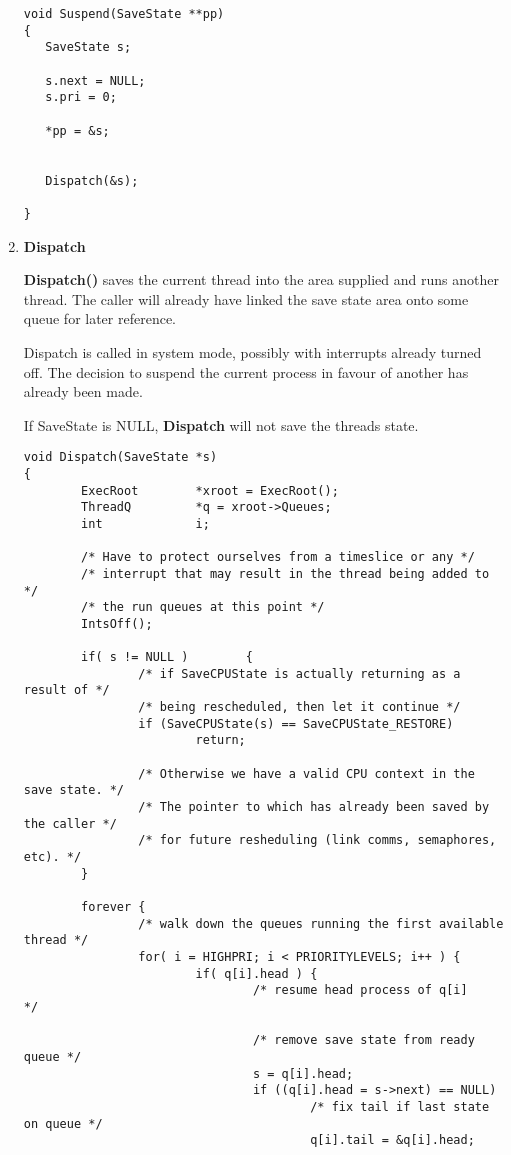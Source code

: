 \begin{enumerate}
\scriptsize
\begin{verbatim}
void Suspend(SaveState **pp)
{
   SaveState s;

   s.next = NULL;
   s.pri = 0;

   *pp = &s;


   Dispatch(&s);

}
\end{verbatim}
\normalsize

\item {\bf Dispatch}

{\bf Dispatch()} saves the current thread into the area supplied
and runs another thread.
The caller will already have linked the save state area onto
some queue for later reference.

Dispatch is called in system mode, possibly with interrupts
already turned off. The decision to suspend the current process in
favour of another has already been made.

If SaveState is NULL, {\bf Dispatch} will not save the threads state.

\scriptsize
\begin{verbatim}
void Dispatch(SaveState *s)
{
        ExecRoot        *xroot = ExecRoot();
        ThreadQ         *q = xroot->Queues;
        int             i;

        /* Have to protect ourselves from a timeslice or any */
        /* interrupt that may result in the thread being added to */
        /* the run queues at this point */
        IntsOff();

        if( s != NULL )        {
                /* if SaveCPUState is actually returning as a result of */
                /* being rescheduled, then let it continue */
                if (SaveCPUState(s) == SaveCPUState_RESTORE)
                        return;

                /* Otherwise we have a valid CPU context in the save state. */
                /* The pointer to which has already been saved by the caller */
                /* for future resheduling (link comms, semaphores, etc). */
        }

        forever {
                /* walk down the queues running the first available thread */
                for( i = HIGHPRI; i < PRIORITYLEVELS; i++ ) {
                        if( q[i].head ) {
                                /* resume head process of q[i]        */

                                /* remove save state from ready queue */
                                s = q[i].head;
                                if ((q[i].head = s->next) == NULL)
                                        /* fix tail if last state on queue */
                                        q[i].tail = &q[i].head;


\end{verbatim}
\end{enumerate}
